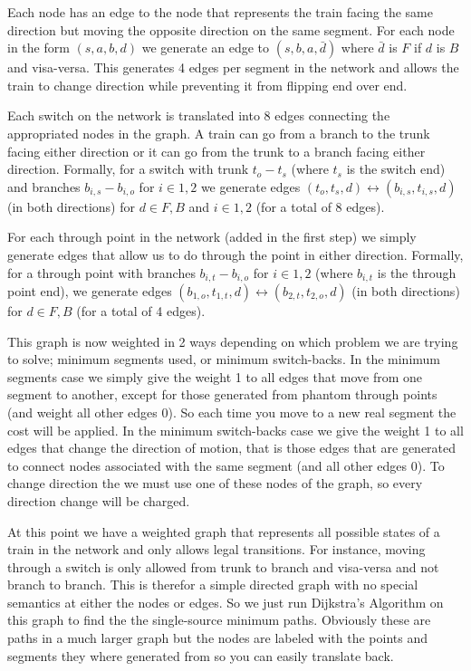 \documentclass[11pt]{article}
\newcommand{\<}{\langle}
\renewcommand{\>}{\rangle}
\begin{document}
Each node has an edge to the node that represents the train facing the same direction but moving the opposite direction on the same segment. For each node in the form $(s, a, b, d)$ we generate an edge to $(s, b, a, \bar{d})$ where $\bar{d}$ is $F$ if $d$ is $B$ and visa-versa. This generates 4 edges per segment in the network and allows the train to change direction while preventing it from flipping end over end.

Each switch on the network is translated into 8 edges connecting the appropriated nodes in the graph. A train can go from a branch to the trunk facing either direction or it can go from the trunk to a branch facing either direction. Formally, for a switch with trunk $t_o - t_s$ (where $t_s$ is the switch end) and branches $b_{i,s} - b_{i,o}$ for $i \in {1,2}$ we generate edges $(t_o,t_s,d) \leftrightarrow (b_{i,s},t_{i,s},d)$ (in both directions) for $d \in {F, B}$ and $i \in {1,2}$ (for a total of 8 edges). 

For each through point in the network (added in the first step) we simply generate edges that allow us to do through the point in either direction. Formally, for a through point with branches $b_{i,t} - b_{i,o}$ for $i \in {1,2}$ (where $b_{i,t}$ is the through point end), we generate edges $(b_{1,o},t_{1,t},d) \leftrightarrow (b_{2,t},t_{2,o},d)$ (in both directions) for $d \in {F, B}$ (for a total of 4 edges). 

This graph is now weighted in 2 ways depending on which problem we are trying to solve; minimum segments used, or minimum switch-backs. In the minimum segments case we simply give the weight 1 to all edges that move from one segment to another, except for those generated from phantom through points (and weight all other edges 0). So each time you move to a new real segment the cost will be applied. In the minimum switch-backs case we give the weight 1 to all edges that change the direction of motion, that is those edges that are generated to connect nodes associated with the same segment (and all other edges 0). To change direction the we must use one of these nodes of the graph, so every direction change will be charged.

At this point we have a weighted graph that represents all possible states of a train in the network and only allows legal transitions. For instance, moving through a switch is only allowed from trunk to branch and visa-versa and not branch to branch. This is therefor a simple directed graph with no special semantics at either the nodes or edges. So we just run Dijkstra's Algorithm on this graph to find the the single-source minimum paths. Obviously these are paths in a much larger graph but the nodes are labeled with the points and segments they where generated from so you can easily translate back.
\end{document}

